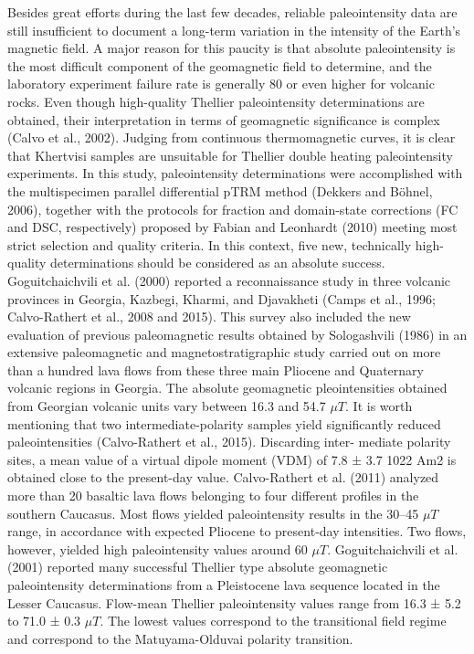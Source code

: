 \documentclass[review]{elsarticle}
\begin{document}
Besides great efforts during the last few decades, reliable paleointensity data are still insufficient to document a long-term variation in the intensity of the Earth’s magnetic field. A major reason for this
paucity is that absolute paleointensity is the most difficult component of the geomagnetic field to determine, and the laboratory experiment failure rate is generally 80 or even higher for volcanic rocks. Even though high-quality Thellier paleointensity determinations are obtained, their interpretation in terms of geomagnetic significance is complex (Calvo et al., 2002). Judging from continuous thermomagnetic
curves, it is clear that Khertvisi samples are unsuitable for Thellier double heating paleointensity experiments. In this study, paleointensity determinations were accomplished with the multispecimen parallel
differential pTRM method (Dekkers and B{\"o}hnel, 2006), together with the protocols for fraction and domain-state corrections (FC and DSC, respectively) proposed by Fabian and Leonhardt (2010) meeting most strict selection and quality criteria. In this context, five new, technically high-quality determinations should be considered as an absolute success.
\\
Goguitchaichvili et al. (2000) reported a reconnaissance study in three volcanic provinces in Georgia, Kazbegi, Kharmi, and Djavakheti (Camps et al., 1996; Calvo-Rathert et al., 2008 and 2015). This survey
also included the new evaluation of previous paleomagnetic results obtained by Sologashvili (1986) in an extensive paleomagnetic and magnetostratigraphic study carried out on more than a hundred lava flows from these three main Pliocene and Quaternary volcanic regions in Georgia. The absolute geomagnetic pleointensities obtained from Georgian volcanic units vary between 16.3 and 54.7 $\mu T$. It is worth
mentioning that two intermediate-polarity samples yield significantly reduced paleointensities (Calvo-Rathert et al., 2015). Discarding inter- mediate polarity sites, a mean value of a virtual dipole moment (VDM) of 7.8 ± 3.7 1022 Am2 is obtained close to the present-day value. Calvo-Rathert et al. (2011) analyzed more than 20 basaltic lava flows belonging to four different profiles in the southern Caucasus. Most flows yielded paleointensity results in the 30–45 $\mu T$ range, in accordance with expected Pliocene to present-day intensities. Two flows, however, yielded high paleointensity values around 60 $\mu T$. Goguitchaichvili et al. (2001) reported many successful Thellier type absolute geomagnetic paleointensity determinations from a Pleistocene lava sequence located in the Lesser Caucasus. Flow-mean Thellier paleointensity values range from 16.3 ± 5.2 to 71.0 ± 0.3 $\mu T$. The lowest values correspond to the transitional field regime and correspond to the Matuyama-Olduvai polarity transition.
\end{document}
